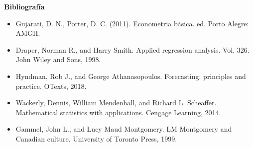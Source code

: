 \documentclass{../oxmathproblems}
\begin{document}
\textbf{Bibliografía}

\begin{itemize}
\item  Gujarati, D. N., Porter, D. C. (2011). Econometria básica. ed. Porto Alegre: AMGH.
\item Draper, Norman R., and Harry Smith. Applied regression analysis. Vol. 326. John Wiley and Sons, 1998.
\item Hyndman, Rob J., and George Athanasopoulos. Forecasting: principles and practice. OTexts, 2018.
\item Wackerly, Dennis, William Mendenhall, and Richard L. Scheaffer. Mathematical statistics with applications. Cengage Learning, 2014.
\item Gammel, John L., and Lucy Maud Montgomery. LM Montgomery and Canadian culture. University of Toronto Press, 1999.
\end{itemize}
\end{document}
